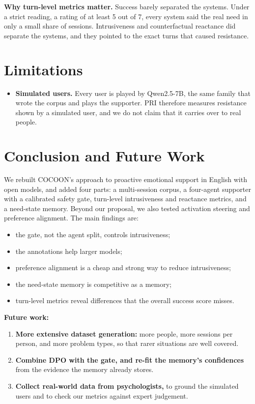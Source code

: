\documentclass[journal]{IEEEtran}
\begin{document}
\textbf{Why turn-level metrics matter.} Success barely separated the systems. Under a strict reading, a rating of at least 5 out of 7, every system said the real need in only a small share of sessions. Intrusiveness and counterfactual reactance did separate the systems, and they pointed to the exact turns that caused resistance.

\section{Limitations}
\begin{itemize}
\item \textbf{Simulated users.} Every user is played by Qwen2.5-7B, the same family that wrote the corpus and plays the supporter. PRI therefore measures resistance shown by a simulated user, and we do not claim that it carries over to real people.
\end{itemize}

\section{Conclusion and Future Work}\label{sec:conc}
We rebuilt COCOON's approach to proactive emotional support in English with open models, and added four parts: a multi-session corpus, a four-agent supporter with a calibrated safety gate, turn-level intrusiveness and reactance metrics, and a need-state memory. Beyond our proposal, we also tested activation steering and preference alignment. The main findings are:
\begin{itemize}
\item the gate, not the agent split, controls intrusiveness;
\item the annotations help larger models;
\item preference alignment is a cheap and strong way to reduce intrusiveness;
\item the need-state memory is competitive as a memory;
\item turn-level metrics reveal differences that the overall success score misses.
\end{itemize}

\textbf{Future work:}
\begin{enumerate}
\item \textbf{More extensive dataset generation:} more people, more sessions per person, and more problem types, so that rarer situations are well covered.
\item \textbf{Combine DPO with the gate, and re-fit the memory's confidences} from the evidence the memory already stores.
\item \textbf{Collect real-world data from psychologists,} to ground the simulated users and to check our metrics against expert judgement.
\end{enumerate}
\end{document}
